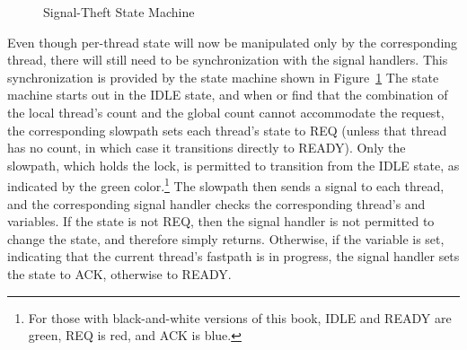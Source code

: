 \begin{figure}[tb]
\begin{center}
\end{center}
\caption{Signal-Theft State Machine}
\label{fig:count:Signal-Theft State Machine}
\end{figure}

Even though per-thread state will now be manipulated only by the
corresponding thread, there will still need to be synchronization
with the signal handlers.
This synchronization is provided by the state machine shown in
Figure~\ref{fig:count:Signal-Theft State Machine}
The state machine starts out in the IDLE state, and when 
or  find that the combination of the local thread's count
and the global count cannot accommodate the request, the corresponding
slowpath sets each thread's  state to REQ (unless that thread
has no count, in which case it transitions directly to READY).
Only the slowpath, which holds the  lock, is permitted to
transition from the IDLE state, as indicated by the green color.\footnote{
	For those with black-and-white versions of this book,
	IDLE and READY are green, REQ is red, and ACK is blue.}
The slowpath then sends a signal to each thread, and the corresponding
signal handler checks the corresponding thread's  and
 variables.
If the  state is not REQ, then the signal handler is not
permitted to change the state, and therefore simply returns.
Otherwise, if the  variable is set, indicating that
the current thread's fastpath is in progress, the signal handler
sets the  state to ACK, otherwise to READY.

